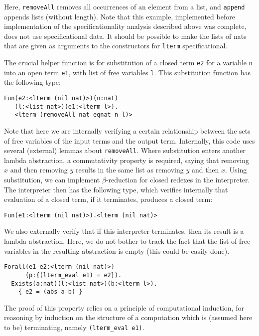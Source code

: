 \documentclass[9pt,natbib]{sigplanconf}
\begin{document}
\noindent Here, \texttt{removeAll} removes all occurrences of an
element from a list, and \texttt{append} appends lists (without
length).  Note that this example, implemented before implementation of
the specificationality analysis described above was complete, does not
use specificational data.  It should be possible to make the lists of
nats that are given as arguments to the constructors for
\texttt{lterm} specificational.

The crucial helper function is for substitution of a closed term
\texttt{e2} for a variable \texttt{n} into an open term \texttt{e1},
with list of free variables \texttt{l}.  This substitution function
has the following type:

\begin{verbatim}
Fun(e2:<lterm (nil nat)>)(n:nat)
   (l:<list nat>)(e1:<lterm l>).
   <lterm (removeAll nat eqnat n l)>
\end{verbatim}

\noindent Note that here we are internally verifying a certain
relationship between the sets of free variables of the input terms and
the output term.  Internally, this code uses several (external) lemmas
about \texttt{removeAll}.  Where substitution enters another lambda
abstraction, a commutativity property is required, saying that
removing $x$ and then removing $y$ results in the same list as
removing $y$ and then $x$.  Using substitution, we can implement
$\beta$-reduction for closed redexes in the interpreter.  The
interpreter then has the following type, which verifies internally
that evaluation of a closed term, if it terminates, produces a closed
term:

\begin{verbatim}
Fun(e1:<lterm (nil nat)>).<lterm (nil nat)> 
\end{verbatim}

We also externally verify that if this interpreter terminates, then
its result is a lambda abstraction.  Here, we do not bother to track
the fact that the list of free variables in the resulting abstraction
is empty (this could be easily done).

\begin{verbatim}
Forall(e1 e2:<lterm (nil nat)>)
      (p:{(lterm_eval e1) = e2}).
  Exists(a:nat)(l:<list nat>)(b:<lterm l>).
    { e2 = (abs a b) }
\end{verbatim}

\noindent The proof of this property relies on a principle of
computational induction, for reasoning by induction on the structure
of a computation which is (assumed here to be) terminating, namely
\texttt{(lterm\_eval e1)}.
\end{document}
